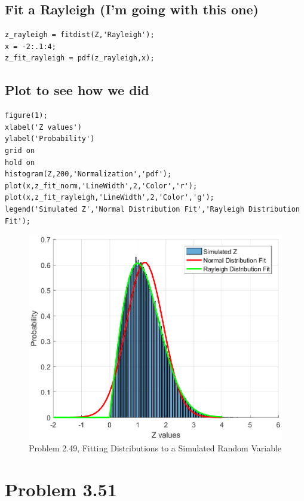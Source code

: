\documentclass[12pt]{article}
\begin{document}
\subsection*{Fit a Rayleigh (I'm going with this one)}

\begin{verbatim}
z_rayleigh = fitdist(Z,'Rayleigh');
x = -2:.1:4;
z_fit_rayleigh = pdf(z_rayleigh,x);
\end{verbatim}

\subsection*{Plot to see how we did}

\begin{verbatim}
figure(1);
xlabel('Z values')
ylabel('Probability')
grid on
hold on
histogram(Z,200,'Normalization','pdf');
plot(x,z_fit_norm,'LineWidth',2,'Color','r');
plot(x,z_fit_rayleigh,'LineWidth',2,'Color','g');
legend('Simulated Z','Normal Distribution Fit','Rayleigh Distribution Fit');
\end{verbatim}

\begin{figure}[htpb]
\centering
\includegraphics[width=\textwidth,height=\textheight,keepaspectratio]{problem_3_49_01.eps}
\caption{Problem 2.49, Fitting Distributions to a Simulated Random Variable}
\end{figure}

\newpage

\section*{Problem 3.51}
\end{document}
